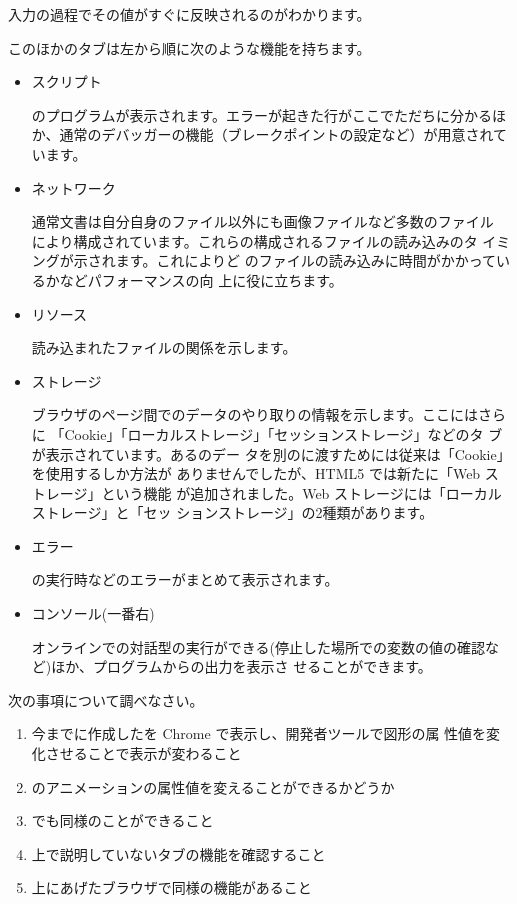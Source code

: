入力の過程でその値がすぐに反映されるのがわかります。

このほかのタブは左から順に次のような機能を持ちます。
\begin{itemize}
 \item スクリプト

\JS のプログラムが表示されます。エラーが起きた行がここでただちに分かるほ
       か、通常のデバッガーの機能（ブレークポイントの設定など）が用意されています。
 \item ネットワーク

通常\HTML 文書は自分自身のファイル以外にも画像ファイルなど多数のファイル
       により構成されています。これらの構成されるファイルの読み込みのタ
       イミングが示されます。これによりど
       のファイルの読み込みに時間がかかっているかなどパフォーマンスの向
       上に役に立ちます。
 \item リソース

読み込まれたファイルの関係を示します。
 \item ストレージ

ブラウザのページ間でのデータのやり取りの情報を示します。ここにはさらに
       「Cookie」「ローカルストレージ」「セッションストレージ」などのタ
       ブが表示されています。ある\HTML のデー
       タを別の\HTML に渡すためには従来は「Cookie」を使用するしか方法が
       ありませんでしたが、HTML5 では新たに「Web ストレージ」という機能
       が追加されました。Web ストレージには「ローカルストレージ」と「セッ
       ションストレージ」の2種類があります。
 \item エラー

\JS の実行時などのエラーがまとめて表示されます。
 \item コンソール(一番右)

オンラインで\JS の対話型の実行ができる(停止した場所での変数の値の確認な
       ど)ほか、プログラムからの出力を表示さ
       せることができます。
\end{itemize}

\begin{Problem}\upshape
次の事項について調べなさい。
\begin{enumerate}
 \item  今までに作成した\SVG を Chrome で表示し、開発者ツールで図形の属
	性値を変化させることで表示が変わること
 \item \SVG のアニメーションの属性値を変えることができるかどうか
 \item \HTML でも同様のことができること
 \item 上で説明していないタブの機能を確認すること
 \item 上にあげたブラウザで同様の機能があること
\end{enumerate}
\end{Problem}
